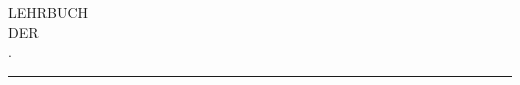 \begin{center}
\vspace*{6cm}
{\Large LEHRBUCH}\\[1.2cm]
{\small DER}\\[1cm]
{\Huge {}.}\\[1.8cm]
\rule{3.5cm}{0.4pt}
\end{center}
